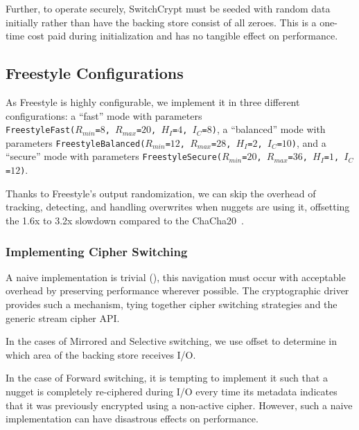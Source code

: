 Further, to operate securely, SwitchCrypt must be seeded with random data
initially rather than have the backing store consist of all zeroes. This is a
one-time cost paid during initialization and has no tangible effect on
performance. 

\subsection{Freestyle Configurations}

As Freestyle is highly configurable, we implement it in three different
configurations: a ``fast'' mode with parameters
\\\texttt{FreestyleFast($R_{min}$=$8$, $R_{max}$=$20$, $H_I$=$4$, $I_C$=$8$)}, a
``balanced'' mode with parameters \texttt{FreestyleBalanced($R_{min}$=$12$,
$R_{max}$=$28$, $H_I$=$2$, $I_C$=$10$)}, and a ``secure'' mode with parameters
\texttt{FreestyleSecure($R_{min}$=$20$, $R_{max}$=$36$, $H_I$=$1$, $I_C$=$12$)}.

Thanks to Freestyle's output randomization, we can skip the overhead of
tracking, detecting, and handling overwrites when nuggets are using it,
offsetting the 1.6x to 3.2x slowdown compared to the ChaCha20~\cite{Freestyle}.

\subsubsection{Implementing Cipher Switching}

A naive implementation is trivial (), this navigation must occur with acceptable overhead by preserving
performance wherever possible. The cryptographic driver provides such a
mechanism, tying together cipher switching strategies and the generic stream
cipher API. 

In the cases of Mirrored and Selective switching, we use offset to determine in
which area of the backing store receives I/O.

In the case of Forward switching, it is tempting to implement it such that a
nugget is completely re-ciphered during I/O every time its metadata indicates
that it was previously encrypted using a non-active cipher. However, such a
naive implementation can have disastrous effects on performance. 

